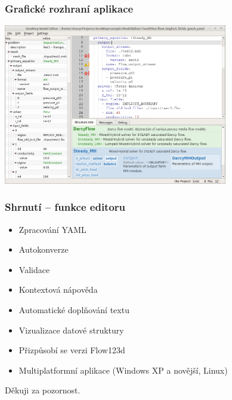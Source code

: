 \begin{frame}
	\frametitle{Grafické rozhraní aplikace}
	\includegraphics[height=7cm]{img/gui.png}
\end{frame}

\begin{frame}
	\frametitle{Shrnutí -- funkce editoru}
	\begin{itemize}[<+->]
	\item Zpracování YAML
	\item Autokonverze
	\item Validace
	\item Kontextová nápověda
	\item Automatické doplňování textu
	\item Vizualizace datové struktury
	\item Přizpůsobí se verzi Flow123d
	\item Multiplatformní aplikace (Windows XP a novější, Linux)
	\end{itemize}
\end{frame}

\begin{frame}
\begin{center}
\label{lastslide}
\huge Děkuji za pozornost.
\end{center}
\end{frame}

